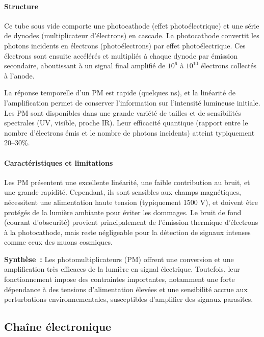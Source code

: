 \documentclass[a4paper,12pt,twoside]{article}
\begin{document}
\paragraph{Structure}
Ce tube sous vide comporte une photocathode (effet photoélectrique) et une série de dynodes (multiplicateur d'électrons) en cascade. La photocathode convertit les photons incidents en électrons (photoélectrons) par effet photoélectrique. Ces électrons sont ensuite accélérés et multipliés à chaque dynode par émission secondaire, aboutissant à un signal final amplifié de $10^6$ à $10^{10}$ électrons collectés à l'anode.

La réponse temporelle d'un PM est rapide (quelques ns), et la linéarité de l'amplification permet de conserver l'information sur l'intensité lumineuse initiale. Les PM sont disponibles dans une grande variété de tailles et de sensibilités spectrales (UV, visible, proche IR). Leur efficacité quantique (rapport entre le nombre d'électrons émis et le nombre de photons incidents) atteint typiquement 20--30\%.

\paragraph{Caractéristiques et limitations}
Les PM présentent une excellente linéarité, une faible contribution au bruit, et une grande rapidité. Cependant, ils sont sensibles aux champs magnétiques, nécessitent une alimentation haute tension (typiquement 1500 V), et doivent être protégés de la lumière ambiante pour éviter les dommages. Le bruit de fond (courant d'obscurité) provient principalement de l'émission thermique d'électrons à la photocathode, mais reste négligeable pour la détection de signaux intenses comme ceux des muons cosmiques.

\begin{remarque}
\textbf{Synthèse~:} Les photomultiplicateurs (PM) offrent une conversion et une amplification très efficaces de la lumière en signal électrique. Toutefois, leur fonctionnement impose des contraintes importantes, notamment une forte dépendance à des tensions d’alimentation élevées et une sensibilité accrue aux perturbations environnementales, susceptibles d’amplifier des signaux parasites.
\end{remarque}


\subsection{Chaîne électronique}
\end{document}
